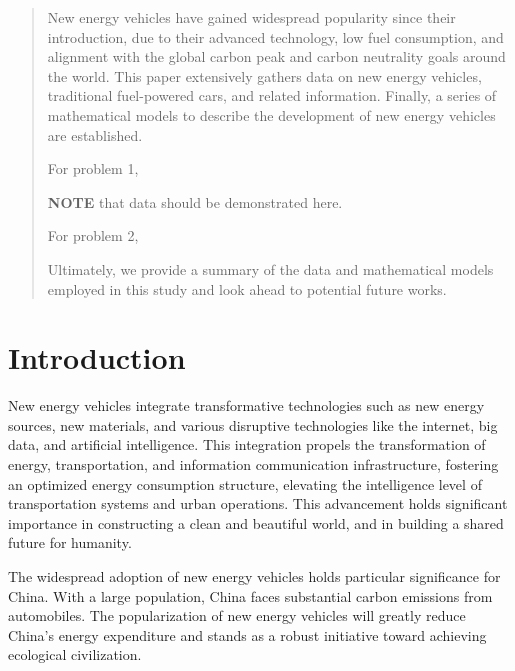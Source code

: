 \documentclass{apmcmthesis}
\begin{document}
\pagestyle{frontmatterstyle}

\begin{abstract}

New energy vehicles have gained widespread popularity since their introduction, due to their advanced technology, low fuel consumption, and alignment with the global carbon peak and carbon neutrality goals around the world. This paper extensively gathers data on new energy vehicles, traditional fuel-powered cars, and related information. Finally, a series of mathematical models to describe the development of new energy vehicles are established.

For problem 1, 

\textbf{NOTE} that data should be demonstrated here.

For problem 2, 

Ultimately, we provide a summary of the data and mathematical models employed in this study and look ahead to potential future works.


\end{abstract}


\newpage
\tableofcontents


\newpage
\pagestyle{mainmatterstyle}
\setcounter{page}{1}
\section{Introduction}




New energy vehicles integrate transformative technologies such as new energy sources, new materials, and various disruptive technologies like the internet, big data, and artificial intelligence. This integration propels the transformation of energy, transportation, and information communication infrastructure, fostering an optimized energy consumption structure, elevating the intelligence level of transportation systems and urban operations. This advancement holds significant importance in constructing a clean and beautiful world, and in building a shared future for humanity.

The widespread adoption of new energy vehicles holds particular significance for China. With a large population, China faces substantial carbon emissions from automobiles. The popularization of new energy vehicles will greatly reduce China's energy expenditure and stands as a robust initiative toward achieving ecological civilization.
\end{document}
